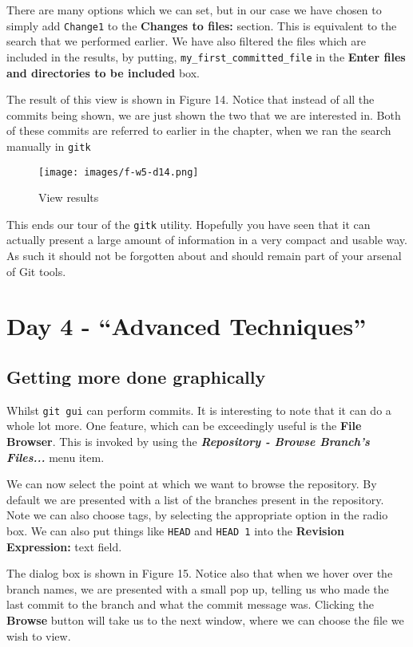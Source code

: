 There are many options which we can set, but in our case we have chosen to simply add \texttt{Change1} to the \textbf{Changes to files:} section.  This is equivalent to the search that we performed earlier.  We have also filtered the files which are included in the results, by putting, \texttt{my\_first\_committed\_file} in the \textbf{Enter files and directories to be included} box.

The result of this view is shown in Figure 14.  Notice that instead of all the commits being shown, we are just shown the two that we are interested in.  Both of these commits are referred to earlier in the chapter, when we ran the search manually in \texttt{gitk}

\begin{figure}[hbt]
\centering
\texttt{[image: images/f-w5-d14.png]}
\caption{View results}
\end{figure} 

This ends our tour of the \texttt{gitk} utility.  Hopefully you have seen that it can actually present a large amount of information in a very compact and usable way.  As such it should not be forgotten about and should remain part of your arsenal of Git tools.

\section{Day 4 - ``Advanced Techniques''}
\subsection{Getting more done graphically}
Whilst \texttt{git gui} can perform commits.  It is interesting to note that it can do a whole lot more.  One feature, which can be exceedingly useful is the \textbf{File Browser}.  This is invoked by using the \textbf{\emph{Repository - Browse Branch's Files...}} menu item.

We can now select the point at which we want to browse the repository.  By default we are presented with a list of the branches present in the repository.  Note we can also choose tags, by selecting the appropriate option in the radio box.  We can also put things like \texttt{HEAD} and \texttt{HEAD~1} into the \textbf{Revision Expression:} text field.  

The dialog box is shown in Figure 15.  Notice also that when we hover over the branch names, we are presented with a small pop up, telling us who made the last commit to the branch and what the commit message was.  Clicking the \textbf{Browse} button will take us to the next window, where we can choose the file we wish to view.

